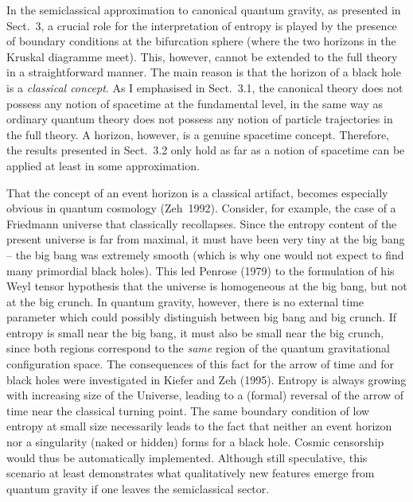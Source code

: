\documentclass[12pt]{article}
\begin{document}
In the semiclassical approximation to canonical quantum gravity,
as presented in Sect.~3, a crucial role for the interpretation
of entropy is played by the presence of boundary conditions
at the bifurcation sphere (where the two horizons in the
Kruskal diagramme meet). This, however, cannot be extended to the
full theory in a straightforward manner. The main reason is that
the horizon of a black hole is a {\em classical concept}. As I
emphasised in Sect.~3.1, the canonical theory does not possess
any notion of spacetime at the fundamental level, in the same way
as ordinary quantum theory does not possess any notion of particle
trajectories in the full theory. A horizon, however, is a genuine
spacetime concept. Therefore, the results presented in Sect.~3.2
only hold as far as a notion of spacetime can be applied at least
in some approximation. 

That the concept of an event horizon is a classical artifact,
becomes especially obvious in quantum cosmology (Zeh~1992).
Consider, for example, the case of a Friedmann universe that
classically recollapses. Since the entropy content of the present
universe is far from maximal, it must have been very tiny at
the big bang -- the big bang was extremely smooth (which is why
one would not expect to find many primordial black holes).
 This led
Penrose (1979) to the formulation of his Weyl tensor hypothesis
that the universe is homogeneous at the big bang, but not
at the big crunch. In quantum gravity, however, 
there is no external time parameter which could possibly 
distinguish between big bang and big crunch. If entropy is small
near the big bang, it must also be small near the big crunch,
since both regions correspond to the {\em same} region of the
quantum gravitational configuration space. The consequences of 
this fact for the arrow of time and for black holes were
investigated in Kiefer and Zeh (1995). Entropy is always growing
with increasing size of the Universe, leading to a (formal)
reversal of the arrow of time near the classical turning point.
The same boundary condition of low entropy at small size
necessarily leads to the fact that neither an event horizon
nor a singularity 
(naked or hidden) forms for a black hole.
 Cosmic censorship would thus be
automatically implemented. Although still speculative, this
scenario at least demonstrates what qualitatively new features
emerge from quantum gravity if one leaves the semiclassical sector.
\end{document}
